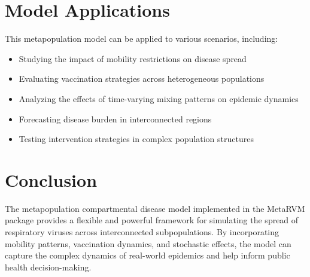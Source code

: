 \documentclass{article}
\begin{document}
\section{Model Applications}

This metapopulation model can be applied to various scenarios, including:

\begin{itemize}
    \item Studying the impact of mobility restrictions on disease spread
    \item Evaluating vaccination strategies across heterogeneous populations
    \item Analyzing the effects of time-varying mixing patterns on epidemic dynamics
    \item Forecasting disease burden in interconnected regions
    \item Testing intervention strategies in complex population structures
\end{itemize}

\section{Conclusion}

The metapopulation compartmental disease model implemented in the MetaRVM package provides a flexible and powerful framework for simulating the spread of respiratory viruses across interconnected subpopulations. By incorporating mobility patterns, vaccination dynamics, and stochastic effects, the model can capture the complex dynamics of real-world epidemics and help inform public health decision-making.
\end{document}
